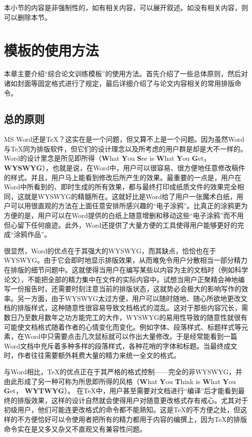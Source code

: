 \documentclass{Diploma}
\begin{document}
本小节的内容是非强制性的，如有相关内容，可以展开叙述。如没有相关内容，则可以删除本节。

\chapter{模板的使用方法}
本章主要介绍“综合论文训练模板”的使用方法。首先介绍了一些总体原则，然后对诸如封面等固定格式进行了规定，最后详细介绍了与论文内容相关的常用排版命令。

\section{总的原则}
MS Word还是\TeX ？这实在是一个问题，但又算不上是一个问题。因为虽然Word与\TeX 同为排版软件，但它们的设计理念以及所考虑的用户群是却是大不一样的。Word的设计里念是所见即所得（\textbf{W}hat \textbf{Y}ou \textbf{S}ee is \textbf{W}hat \textbf{Y}ou \textbf{G}et，\textbf{WYSWYG}），也就是说，在Word中，用户可以很容易、很方便地任意修改稿件的样式。并且，用户马上能看到修改后所产生的效果。最重要的一点是，用户在Word中所看到的、即时生成的所有效果，都与最终打印成纸质文件的效果完全相同，这就是WYSWYG的精髓所在。这就好比是Word给了用户一张魔术白纸，用户可以用很直观的方法在上面任意安排所感兴趣的“电子涂鸦”。比真正的涂鸦更为方便的是，用户可以在Word提供的白纸上随意增删和移动这些“电子涂鸦”而不用但心留下任何痕迹。此外，Word还提供了大量方便的工具使得用户能够更好的完成“涂鸦作品”。

很显然，Word的优点在于其强大的WYSWYG，而其缺点，恰恰也在于WYSWYG。由于它会即时地显示排版效果，从而难免令用户分散相当一部分精力在排版的细节问题中。这就使得当用户在编写某些以内容为主的文档时（例如科学论文），不能把全部的精力集中在文件的实际内容中。试想当用户正聚精会神地编写一份报告时，还需要时刻注意当前的排版状态，这就势必会极大的影响写作的效率。另一方面，由于WYSWYG太过方便，用户可以随时随地、随心所欲地更改文档的排版样式，这种随意性很容易导致文档格式的混乱。这对于那些内容冗长，需数日乃至数月数年之功方能完工的大作，WYSWYG的易用性导致的随意性就很有可能使文档格式随着作者的心情变化而变化。例如字体、段落样式、标题样式等元素，在Word中只需要点击几次鼠标就可以作出大量修改。于是经常能看到一篇Word文档中充斥着多种多样的段落样式，各种花哨的字体和标题。当最终成文时，作者往往需要额外耗费大量的精力来统一全文的格式。

与Word相比，\TeX 的优点正在于其严格的格式控制——完全的非WYSWYG，并由此形成了另一种可称为所思即所得的风格（\textbf{W}hat \textbf{Y}ou \textbf{T}hink is \textbf{W}hat \textbf{Y}ou \textbf{G}et， \textbf{WYTWYG}）。 在\TeX 中，用户甚至需要对文档进行“编译”后才能看到最终的排版效果，这样的设计自然就会使得用户对随意更改格式存有戒心。尤其对于初级用户，他们可能连更改格式的命令都不能熟知。这是\TeX 的不方便之处，但这样的不方便恰好可以令使用者把所有的精力都用于内容的编撰上，因为\TeX 的排版命令实在是又多又杂又不直观又有兼容性问题。
\end{document}
